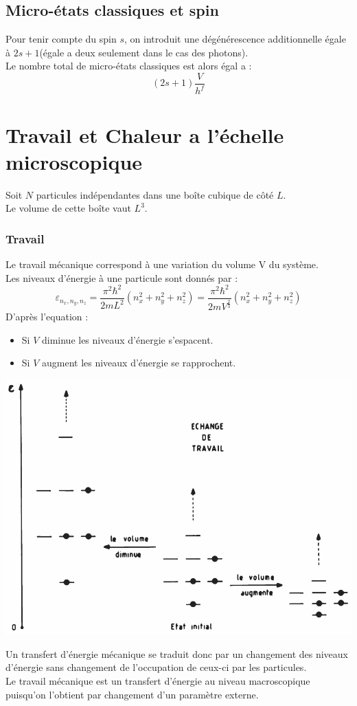 \documentclass[12pt,oneside]{book}
\begin{document}
\subsection{Micro-états classiques et spin}
Pour tenir compte du spin $s$, on introduit une dégénérescence additionnelle égale à $2s +1$(égale a deux seulement dans le cas des photons).\\
Le nombre total de micro-états classiques est alors égal a :
\[ \boxed{ (2s +1) \frac{V}{h^f} } \]
\section{Travail et Chaleur a l'échelle microscopique}
Soit $N$ particules indépendantes dans une boîte cubique de côté $L$.\\
Le volume de cette boîte vaut $L^3$.\\
\subsubsection{Travail}
Le travail mécanique correspond à une variation du volume V du système.\\
Les niveaux d'énergie à une particule sont donnés par :
\[ \varepsilon_{n_x,n_y,n_z} = \frac{\pi^2 \hbar^2}{2mL^2}(n_x^2 + n_y^2 + n_z^2) = \frac{\pi^2 \hbar^2}{2mV^{\frac{2}{3}}}(n_x^2 + n_y^2 + n_z^2) \]
D'après l'equation :
\begin{itemize}
	\item Si $V$ diminue les niveaux d'énergie s'espacent.
	\item Si $V$ augment les niveaux d'énergie se rapprochent.
\end{itemize}
\begin{center}
	\includegraphics[width=0.5\linewidth]{../pic/3306/12.png}
\end{center}
Un transfert d'énergie mécanique se traduit donc par un changement des niveaux d'énergie sans changement de l'occupation de ceux-ci par les particules.\\
Le travail mécanique est un transfert d'énergie au niveau macroscopique puisqu'on l'obtient par changement d'un paramètre externe.
\end{document}
